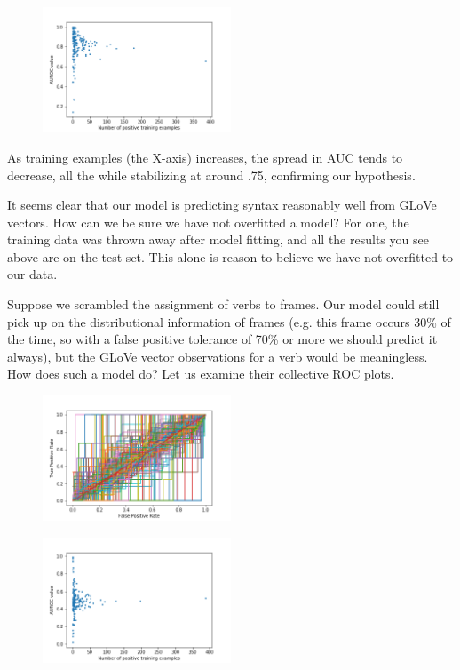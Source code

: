 \documentclass[a4paper]{article}
\begin{document}
\begin{figure}[H]
\centering
\includegraphics[width=0.5\textwidth]{auc_scatter5.png}
\caption{\label{fig:frog} }
\end{figure}

As training examples (the X-axis) increases, the spread in AUC tends to decrease, all the while stabilizing at around .75, confirming our hypothesis.

It seems clear that our model is predicting syntax reasonably well from GLoVe vectors. How can we be sure we have not overfitted a model? For one, the training data was thrown away after model fitting, and all the results you see above are on the test set. This alone is reason to believe we have not overfitted to our data.

Suppose we scrambled the assignment of verbs to frames. Our model could still pick up on the distributional information of frames (e.g. this frame occurs 30\% of the time, so with a false positive tolerance of 70\% or more we should predict it always), but the GLoVe vector observations for a verb would be meaningless. How does such a model do? Let us examine their collective ROC plots. 

\begin{figure}[H]
	\centering
	\includegraphics[width=0.5\textwidth]{auc_plot5rand.png}
	\caption{\label{fig:frog} }
\end{figure}

\begin{figure}[H]
	\centering
	\includegraphics[width=0.5\textwidth]{auc_scatter5rand.png}
	\caption{\label{fig:frog} }
\end{figure}
\end{document}
